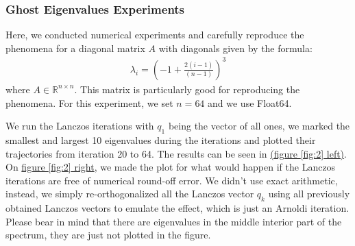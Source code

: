 \documentclass[]{article}
\theoremstyle{definition}
\begin{document}
        \subsubsection{Ghost Eigenvalues Experiments}
            Here, we conducted numerical experiments and carefully reproduce the phenomena for a diagonal matrix $A$ with diagonals given by the formula: 
            \begin{align}
                \lambda_i = \left(-1 + \frac{2(i - 1)}{(n - 1)}\right)^3
            \end{align}\label{eqn:the_ill_conditioned_matrix}
            where $A\in \mathbb R^{n\times n}$. This matrix is particularly good for reproducing the phenomena. For this experiment, we set $n = 64$ and we use Float64. 
            \par
            We run the Lanczos iterations with $q_1$ being the vector of all ones, we marked the smallest and largest 10 eigenvalues during the iterations and plotted their trajectories from iteration 20 to 64. The results can be seen in \hyperref[fig:2]{(figure \ref*{fig:2} left)}. On \hyperref[fig:2]{figure \ref*{fig:2} right}, we made the plot for what would happen if the Lanczos iterations are free of numerical round-off error. We didn't use exact arithmetic, instead, we simply re-orthogonalized all the Lanczos vector $q_k$ using all previously obtained Lanczos vectors to emulate the effect, which is just an Arnoldi iteration. Please bear in mind that there are eigenvalues in the middle interior part of the spectrum, they are just not plotted in the figure. 
\end{document}
